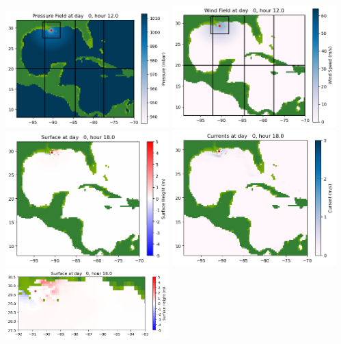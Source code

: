 \documentclass[11pt]{article}
\begin{document}
\includegraphics[width=0.475\textwidth]{frame0010fig1006.png}
\vskip 10pt 
\includegraphics[width=0.475\textwidth]{frame0010fig1007.png}
\vskip 10pt 
\includegraphics[width=0.475\textwidth]{frame0011fig1001.png}
\includegraphics[width=0.475\textwidth]{frame0011fig1002.png}
\vskip 10pt 
\includegraphics[width=0.475\textwidth]{frame0011fig1003.png}
\end{document}
